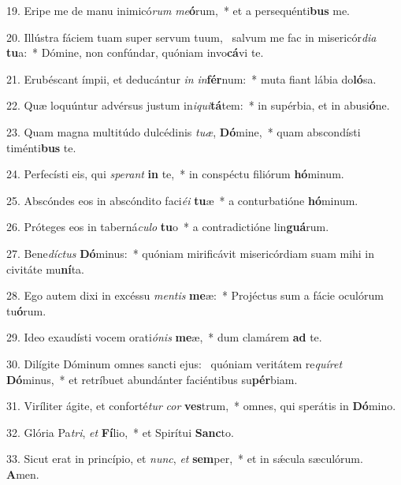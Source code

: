 19. Eripe me de manu inimicó\textit{rum} \textit{me}\textbf{ó}rum,~*  et a persequénti\textbf{bus} me.\

20. Illústra fáciem tuam super servum tuum, \dag\  salvum me fac in misericór\textit{di}\textit{a} \textbf{tu}a:~*  Dómine, non confúndar, quóniam invo\textbf{cá}vi te.\

21. Erubéscant ímpii, et deducántur \textit{in} \textit{in}\textbf{fér}num:~*  muta fiant lábia do\textbf{ló}sa.\

22. Quæ loquúntur advérsus justum in\textit{i}\textit{qui}\textbf{tá}tem:~*  in supérbia, et in abusi\textbf{ó}ne.\

23. Quam magna multitúdo dulcédinis \textit{tu}\textit{æ}, \textbf{Dó}mine,~*  quam abscondísti timénti\textbf{bus} te.\

24. Perfecísti eis, qui \textit{spe}\textit{rant} \textbf{in} te,~*  in conspéctu filiórum \textbf{hó}minum.\

25. Abscóndes eos in abscóndito faci\textit{é}\textit{i} \textbf{tu}æ~*  a conturbatióne \textbf{hó}minum.\

26. Próteges eos in taberná\textit{cu}\textit{lo} \textbf{tu}o~*  a contradictióne lin\textbf{guá}rum.\

27. Bene\textit{díc}\textit{tus} \textbf{Dó}minus:~*  quóniam mirificávit misericórdiam suam mihi in civitáte mu\textbf{ní}ta.\

28. Ego autem dixi in excéssu \textit{men}\textit{tis} \textbf{me}æ:~*  Projéctus sum a fácie oculórum tu\textbf{ó}rum.\

29. Ideo exaudísti vocem orati\textit{ó}\textit{nis} \textbf{me}æ,~*  dum clamárem \textbf{ad} te.\

30. Dilígite Dóminum omnes sancti ejus: \dag\  quóniam veritátem re\textit{quí}\textit{ret} \textbf{Dó}minus,~*  et retríbuet abundánter faciéntibus su\textbf{pér}biam.\

31. Viríliter ágite, et conforté\textit{tur} \textit{cor} \textbf{ves}trum,~*  omnes, qui sperátis in \textbf{Dó}mino.\

32. Glória Pa\textit{tri}, \textit{et} \textbf{Fí}lio,~*  et Spirítui \textbf{Sanc}to.\

33. Sicut erat in princípio, et \textit{nunc}, \textit{et} \textbf{sem}per,~*  et in sǽcula sæculórum. \textbf{A}men.\


